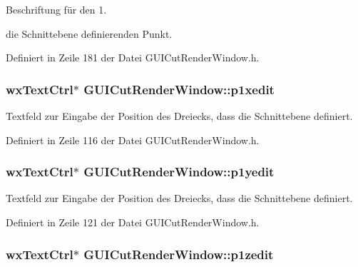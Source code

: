 Beschriftung für den 1. 

die Schnittebene definierenden Punkt. 

Definiert in Zeile 181 der Datei G\-U\-I\-Cut\-Render\-Window.\-h.

\hypertarget{classGUICutRenderWindow_a509b5ca573c287e3863e952ec629fa7b}{
\subsubsection[{p1xedit}]{\setlength{\rightskip}{0pt plus 5cm}wx\-Text\-Ctrl$\ast$ G\-U\-I\-Cut\-Render\-Window\-::p1xedit\hspace{0.3cm}{\ttfamily [private]}}}\label{classGUICutRenderWindow_a509b5ca573c287e3863e952ec629fa7b}


Textfeld zur Eingabe der Position des Dreiecks, dass die Schnittebene definiert. 



Definiert in Zeile 116 der Datei G\-U\-I\-Cut\-Render\-Window.\-h.

\hypertarget{classGUICutRenderWindow_a93e837c15d8c6e7f420fd457c49024f2}{
\subsubsection[{p1yedit}]{\setlength{\rightskip}{0pt plus 5cm}wx\-Text\-Ctrl$\ast$ G\-U\-I\-Cut\-Render\-Window\-::p1yedit\hspace{0.3cm}{\ttfamily [private]}}}\label{classGUICutRenderWindow_a93e837c15d8c6e7f420fd457c49024f2}


Textfeld zur Eingabe der Position des Dreiecks, dass die Schnittebene definiert. 



Definiert in Zeile 121 der Datei G\-U\-I\-Cut\-Render\-Window.\-h.

\hypertarget{classGUICutRenderWindow_a5843efcb13e1d56ea95932d052e5666a}{
\subsubsection[{p1zedit}]{\setlength{\rightskip}{0pt plus 5cm}wx\-Text\-Ctrl$\ast$ G\-U\-I\-Cut\-Render\-Window\-::p1zedit\hspace{0.3cm}{\ttfamily [private]}}}\label{classGUICutRenderWindow_a5843efcb13e1d56ea95932d052e5666a}



